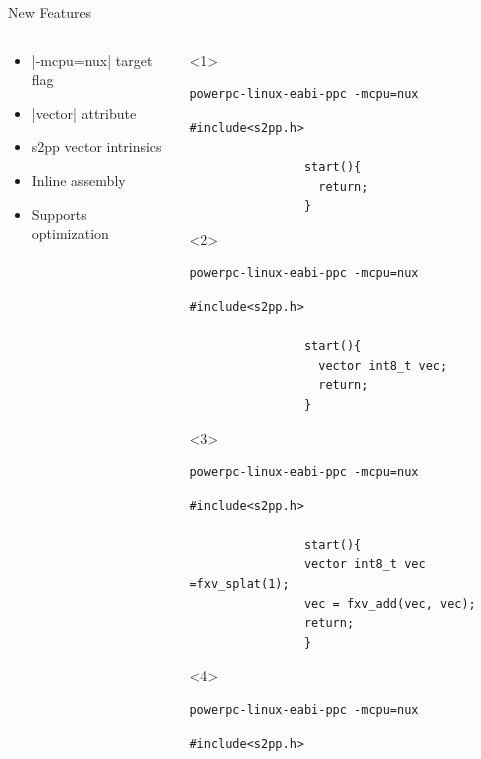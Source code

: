 \documentclass[10pt,aspectratio=169]{beamer}
\begin{document}
\begin{frame}[fragile]{New Features}
    \begin{columns}[c]
    \begin{column}{0.5\textwidth}
		\begin{itemize}[<+->]
			\setlength\itemsep{1em}
            \item |-mcpu=nux| target flag
			\item |vector| attribute
			\item s2pp vector intrinsics
			\item Inline assembly
			\item Supports optimization
        \end{itemize}
    \end{column}

    \begin{column}{0.5\textwidth}
        \centering
		\begin{onlyenv}<1>
				\begin{lstlisting}[title=Compiling Directive]
powerpc-linux-eabi-ppc -mcpu=nux
				\end{lstlisting}
				
				\begin{lstlisting}[title=Example File]
				#include<s2pp.h>
				
				start(){
				  return;
				}
				\end{lstlisting}
	\end{onlyenv}
		\begin{onlyenv}<2>
				\begin{lstlisting}[title=Compiling Directive]
powerpc-linux-eabi-ppc -mcpu=nux
				\end{lstlisting}
				\begin{lstlisting}[title=Example File]
				#include<s2pp.h>

				start(){
				  vector int8_t vec;
				  return;
				}
				\end{lstlisting}
	\end{onlyenv}
		\begin{onlyenv}<3>
				\begin{lstlisting}[title=Compiling Directive]
powerpc-linux-eabi-ppc -mcpu=nux
				\end{lstlisting}
				\begin{lstlisting}[title=Example File]
				#include<s2pp.h>

				start(){
				vector int8_t vec =fxv_splat(1);
				vec = fxv_add(vec, vec);
				return;
				}
				\end{lstlisting}
	\end{onlyenv}
		\begin{onlyenv}<4>
				\begin{lstlisting}[title=Compiling Directive]
powerpc-linux-eabi-ppc -mcpu=nux
				\end{lstlisting}
				\begin{lstlisting}[title=Example File]
				#include<s2pp.h>


\end{lstlisting}
\end{onlyenv}
\end{column}
\end{columns}
\end{frame}
\end{document}
